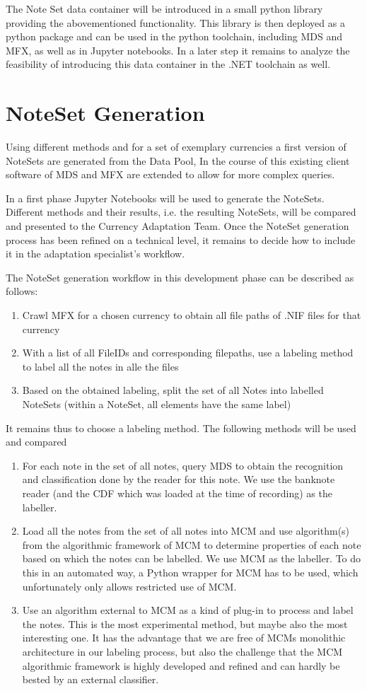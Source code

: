 The Note Set data container will be introduced in a small python library providing the abovementioned functionality. This library is then deployed as a python package and can be used in the python toolchain, including MDS and MFX, as well as in Jupyter notebooks. In a later step it remains to analyze the feasibility of introducing this data container in the .NET toolchain as well.

\section{NoteSet Generation}
Using different methods and for a set of exemplary currencies a first version of NoteSets are generated from the Data Pool, In the course of this existing client software of MDS and MFX are extended to allow for more complex queries.\par
In a first phase Jupyter Notebooks will be used to generate the NoteSets. Different methods and their results, i.e. the resulting NoteSets, will be compared and presented to the Currency Adaptation Team. Once the NoteSet generation process has been refined on a technical level, it remains to decide how to include it in the adaptation specialist's workflow.\par
The NoteSet generation workflow in this development phase can be described as follows: 
\begin{enumerate}
\item Crawl MFX for a chosen currency to obtain all file paths of .NIF files for that currency
\item With a list of all FileIDs and corresponding filepaths, use a labeling method to label all the notes in alle the files
\item Based on the obtained labeling, split the set of all Notes into labelled NoteSets (within a NoteSet, all elements have the same label)
\end{enumerate}
It remains thus to choose a labeling method. The following methods will be used and compared
\begin{enumerate}
\item For each note in the set of all notes, query MDS to obtain the recognition and classification done by the reader for this note. We use the banknote reader (and the CDF which was loaded at the time of recording) as the labeller.
\item Load all the notes from the set of all notes into MCM and use algorithm(s) from the algorithmic framework of MCM to determine properties of each note based on which the notes can be labelled. We use MCM as the labeller. To do this in an automated way, a Python wrapper for MCM has to be used, which unfortunately only allows restricted use of MCM.
\item Use an algorithm external to MCM as a kind of plug-in to process and label the notes. This is the most experimental method, but maybe also the most interesting one. It has the advantage that we are free of MCMs monolithic architecture in our labeling process, but also the challenge that the MCM algorithmic framework is highly developed and refined and can hardly be bested by an external classifier.
\end{enumerate}
